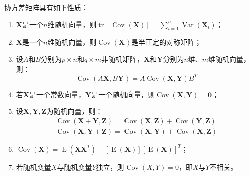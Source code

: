 \begin{property}\label{prop:CovMat}
	协方差矩阵具有如下性质：
	\begin{enumerate}
		\item $\mathbf{X}$是一个$n$维随机向量，则$\operatorname{tr}[\operatorname{Cov}(\mathbf{X})]=\sum\limits_{i=1}^{n}\operatorname{Var}(\mathbf{X}_i)$；
		\item $\mathbf{X}$是一个$n$维随机向量，则$\operatorname{Cov}(\mathbf{X})$是半正定的对称矩阵；
		\item 设$A$和$B$分别为$p\times n$和$q\times m$非随机矩阵，$\mathbf{X}$和$\mathbf{Y}$分别为$n$维、$m$维随机向量，则：
		\begin{equation*}
			\operatorname{Cov}(A\mathbf{X},B\mathbf{Y})=A\operatorname{Cov}(\mathbf{X},\mathbf{Y})B^T
		\end{equation*}
		\item 若$\mathbf{X}$是一个常数向量，$\mathbf{Y}$是一个随机向量，则$\operatorname{Cov}(\mathbf{X},\mathbf{Y})=\mathbf{0}$；
		\item 设$\mathbf{X},\mathbf{Y},\mathbf{Z}$为随机向量，则：
		\begin{gather*}
			\operatorname{Cov}(\mathbf{X}+\mathbf{Y},\mathbf{Z})=\operatorname{Cov}(\mathbf{X},\mathbf{Z})+\operatorname{Cov}(\mathbf{Y},\mathbf{Z}) \\
			\operatorname{Cov}(\mathbf{X},\mathbf{Y}+\mathbf{Z})=\operatorname{Cov}(\mathbf{X},\mathbf{Y})+\operatorname{Cov}(\mathbf{X},\mathbf{Z})
		\end{gather*}
		\item $\operatorname{Cov}(\mathbf{X})=\operatorname{E}(\mathbf{X}\mathbf{X}^T)-[\operatorname{E}(\mathbf{X})][\operatorname{E}(\mathbf{X})]^T$；
		\item 若随机变量$X$与随机变量$Y$独立，则$\operatorname{Cov}(X,Y)=0$，即$X$与$Y$不相关。
	\end{enumerate}
\end{property}
